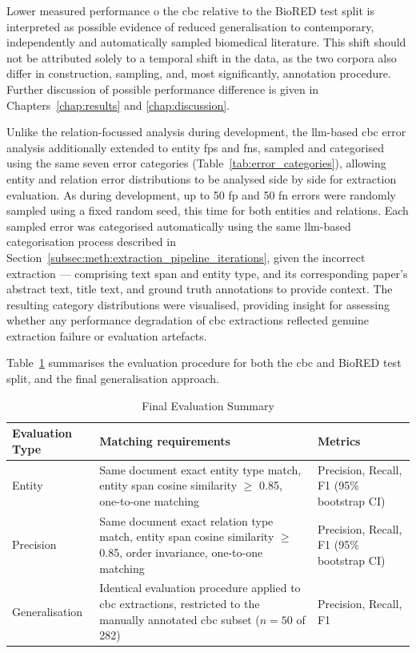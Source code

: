 Lower measured performance o the \gls{cbc} relative to the BioRED test split is interpreted as possible evidence of reduced generalisation to contemporary, independently and automatically sampled biomedical literature. This shift should not be attributed solely to a temporal shift in the data, as the two corpora also differ in construction, sampling, and, most significantly, annotation procedure. Further discussion of possible performance difference is given in Chapters~\ref{chap:results} and \ref{chap:discussion}.


Unlike the relation-focussed analysis during development, the \gls{llm}-based \gls{cbc} error analysis additionally extended to entity \glspl{fp} and \glspl{fn}, sampled and categorised using the same seven error categories (Table~\ref{tab:error_categories}), allowing entity and relation error distributions to be analysed side by side for extraction evaluation. As during development, up to 50 \gls{fp} and 50 \gls{fn} errors were randomly sampled using a fixed random seed, this time for both entities and relations. Each sampled error was categorised automatically using the same \gls{llm}-based categorisation process described in Section~\ref{subsec:meth:extraction_pipeline_iterations}, given the incorrect extraction --- comprising text span and entity type, and its corresponding paper's abstract text, title text, and ground truth annotations to provide context. The resulting category distributions were visualised, providing insight for assessing whether any performance degradation of \gls{cbc} extractions reflected genuine extraction failure or evaluation artefacts.

Table~\ref{tab:final_evaluation_summary} summarises the evaluation procedure for both the \gls{cbc} and BioRED test split, and the final generalisation approach.

\begin{table}[H]
    \centering
    \caption{Final Evaluation Summary}
    \label{tab:final_evaluation_summary}
    \begin{tabularx}{\textwidth}{l X X}
        \toprule
        Evaluation Type & Matching requirements & Metrics \\
        \midrule
        Entity & Same document exact entity type match, entity span cosine similarity $\geq$ 0.85, one-to-one matching & Precision, Recall, F1 (95\% bootstrap CI) \\
        Precision & Same document exact relation type match, entity span cosine similarity $\geq$ 0.85, order invariance, one-to-one matching & Precision, Recall, F1 (95\% bootstrap CI) \\
        Generalisation & Identical evaluation procedure applied to \gls{cbc} extractions, restricted to the manually annotated \gls{cbc} subset ($n=50$ of 282) & Precision, Recall, F1 \\
        \bottomrule
    \end{tabularx}
\end{table}

